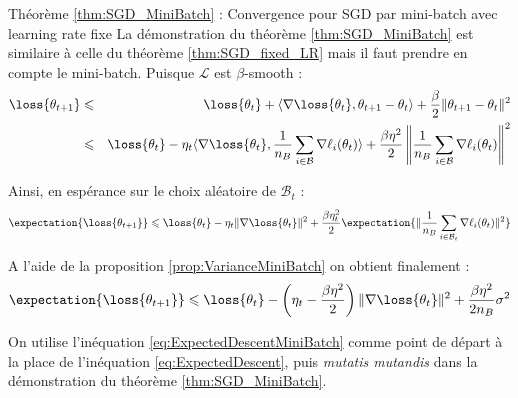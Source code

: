 \documentclass{beamer}
\begin{document}
\begin{frame}{}{Théorème \ref{thm:SGD_MiniBatch} : Convergence pour SGD par mini-batch avec learning rate fixe}
	La démonstration du théorème \ref{thm:SGD_MiniBatch} est similaire à celle du théorème \ref{thm:SGD_fixed_LR} mais il faut prendre en compte le mini-batch. Puisque $\mathcal{L}$ est $\beta$-smooth : 
	\begin{eqnarray*}
		\loss{\theta_{t+1}} &\leqslant& \loss{\theta_t} + \langle \nabla \loss{\theta_t}, \theta_{t+1}-\theta_t\rangle + \frac{\beta}{2}\|\theta_{t+1}-\theta_t\|^2\\
		&\leqslant& \loss{\theta_t} - \eta_t\langle \nabla \loss{\theta_t}, \frac{1}{n_B}\sum_{i\in \mathcal{B}}\nabla \ell_i(\theta_t)\rangle + \frac{\beta\eta^2}{2} \left\|\frac{1}{n_B}\sum_{i\in \mathcal{B}}\nabla \ell_i(\theta_t)\right\|^2
	\end{eqnarray*}
	
	Ainsi, en espérance sur le choix aléatoire de $\mathcal{B}_t$ :
	\begin{equation*}
		\expectation{\loss{\theta_{t+1}}} \leqslant \loss{\theta_t} - \eta_t \|\nabla \loss{\theta_t}\|^2 + \frac{\beta\eta_t^2}{2} \expectation{\|\frac{1}{n_B}\sum_{i\in \mathcal{B}_t}\nabla\ell_{i}(\theta_t)\|^2}
	\end{equation*}
	
	A l'aide de la proposition \ref{prop:VarianceMiniBatch} on obtient finalement :
	\begin{equation}
		\expectation{\loss{\theta_{t+1}}} \leqslant \loss{\theta_t} - \left(\eta_t-\frac{\beta\eta^2}{2}\right)\|\nabla\loss{\theta_t}\|^2 + \frac{\beta\eta^2}{2n_B}\sigma^2
		\label{eq:ExpectedDescentMiniBatch}
	\end{equation}
	
	On utilise l'inéquation \ref{eq:ExpectedDescentMiniBatch} comme point de départ à la place de l'inéquation \ref{eq:ExpectedDescent}, puis \textit{mutatis mutandis} dans la démonstration du théorème \ref{thm:SGD_MiniBatch}.
\end{frame}
\end{document}
